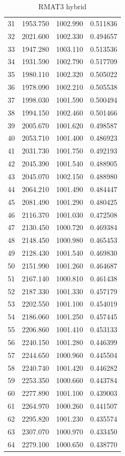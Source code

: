 \documentclass[10pt,twocolumn,letterpaper]{article}
\begin{document}
\begin{table}[h]
\begin{tabular}{@{}c|ccc@{}}
31 & 1953.750 & 1002.990 & 0.511836 \\
32 & 2021.600 & 1002.330 & 0.494657 \\
33 & 1947.280 & 1003.110 & 0.513536 \\
34 & 1931.590 & 1002.790 & 0.517709 \\
35 & 1980.110 & 1002.320 & 0.505022 \\
36 & 1978.090 & 1002.210 & 0.505538 \\
37 & 1998.030 & 1001.590 & 0.500494 \\
38 & 1994.150 & 1002.460 & 0.501466 \\
39 & 2005.670 & 1001.620 & 0.498587 \\
40 & 2053.710 & 1001.400 & 0.486923 \\
41 & 2031.730 & 1001.750 & 0.492193 \\
42 & 2045.390 & 1001.540 & 0.488905 \\
43 & 2045.070 & 1002.150 & 0.488980 \\
44 & 2064.210 & 1001.490 & 0.484447 \\
45 & 2081.490 & 1001.290 & 0.480425 \\
46 & 2116.370 & 1001.030 & 0.472508 \\
47 & 2130.450 & 1000.720 & 0.469384 \\
48 & 2148.450 & 1000.980 & 0.465453 \\
49 & 2128.430 & 1001.540 & 0.469830 \\
50 & 2151.990 & 1001.260 & 0.464687 \\
51 & 2167.140 & 1000.810 & 0.461438 \\
52 & 2187.330 & 1001.330 & 0.457179 \\
53 & 2202.550 & 1001.100 & 0.454019 \\
54 & 2186.060 & 1001.250 & 0.457445 \\
55 & 2206.860 & 1001.410 & 0.453133 \\
56 & 2240.150 & 1001.280 & 0.446399 \\
57 & 2244.650 & 1000.960 & 0.445504 \\
58 & 2240.740 & 1001.420 & 0.446282 \\
59 & 2253.350 & 1000.660 & 0.443784 \\
60 & 2277.890 & 1001.100 & 0.439003 \\
61 & 2264.970 & 1000.260 & 0.441507 \\
62 & 2295.820 & 1001.230 & 0.435574 \\
63 & 2307.070 & 1000.970 & 0.433450 \\
64 & 2279.100 & 1000.650 & 0.438770 \\
\bottomrule
\end{tabular}
\caption{RMAT3 hybrid}
\end{table}
\end{document}
